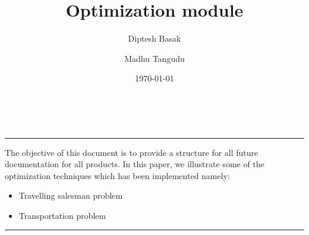 \documentclass[titlepage]{article}
\title{Optimization module}
\author{
Diptesh Basak\\
\and
Madhu Tangudu\\
}
\date{\today}
\renewenvironment{abstract}
 {\par\noindent\textbf{\Large\abstractname}\\ \ignorespaces}
 {\par\medskip}
\begin{document}
\maketitle


\pagebreak

\begin{abstract}
\hrule
\hfill
\doublespacing
\newline The objective of this document is to provide a structure for all
future documentation for all products. In this paper, we illustrate some of the optimization techniques which has
been implemented namely:
\begin{itemize}
  \item Travelling salesman problem
  \item Transportation problem
\end{itemize}

\end{abstract}

\pagebreak

\tableofcontents

\listoftables

\pagebreak

\hrule
\end{document}
